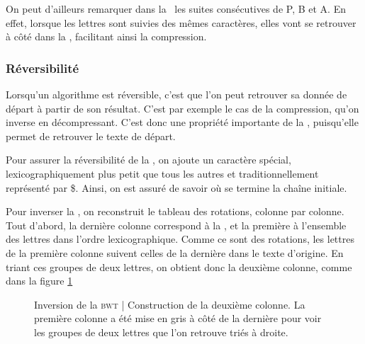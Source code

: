 On peut d'ailleurs remarquer dans la \bwt\ les suites consécutives de P, B et A. En effet, lorsque les lettres sont suivies des mêmes caractères, elles vont se retrouver à côté dans la \bwt, facilitant ainsi la compression.

\subsubsection{Réversibilité}
Lorsqu'un algorithme est réversible, c'est que l'on peut retrouver sa donnée de départ à partir de son résultat. C'est par exemple le cas de la compression, qu'on inverse en décompressant. C'est donc une propriété importante de la \bwt, puisqu'elle permet de retrouver le texte de départ.

Pour assurer la réversibilité de la \bwt, on ajoute un caractère spécial, lexicographiquement plus petit que tous les autres et traditionnellement représenté par \$. Ainsi, on est assuré de savoir où se termine la chaîne initiale.

Pour inverser la \bwt, on reconstruit le tableau des rotations, colonne par colonne.
Tout d'abord, la dernière colonne correspond à la \bwt, et la première à l'ensemble des lettres dans l'ordre lexicographique. Comme ce sont des rotations, les lettres de la première colonne suivent celles de la dernière dans le texte d'origine. En triant ces groupes de deux lettres, on obtient donc la deuxième colonne, comme dans la figure \ref{unbwt}

\begin{figure}[h!]
\caption{Inversion de la \textsc{bwt} | Construction de la deuxième colonne. La première colonne a été mise en gris à côté de la dernière pour voir les groupes de deux lettres que l'on retrouve triés à droite.}
\label{unbwt} 
\end{figure}

